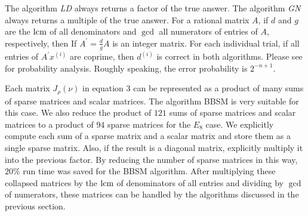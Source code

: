 The algorithm {\em LD}
always returns a factor of the true answer.
The algorithm {\em GN}
always returns a multiple of the true answer.
For a rational matrix $A$, if 
$d$ and $g$ are the $\mbox{lcm}$ of all denominators 
and $\gcd$ all numerators of entries of $A$, respectively,
then If $A^\prime = \frac{d}{g}A$ is an integer matrix.
For each individual trial,
if all entries of  $A^\prime x^{(i)}$ are coprime,
then $d^{(i)}$ is correct in both algorithms.
Please see \cite{Saunders::LA::2004} for probability analysis. 
Roughly speaking, the error probability is $2^{-n + 1}$.

Each matrix $J_\rho(\nu)$ in equation 3 can be represented as
a product of many sums of sparse matrices and scalar matrices.
The algorithm BBSM is very suitable for this case.
We also reduce the product of $121$ sums of sparse matrices and scalar matrices
to a product of $94$ sparse matrices for the $E_8$ case. 
We explicitly compute each sum of a sparse matrix and a scalar matrix and 
store them as a single sparse matrix.  Also, if the result is a diagonal matrix,
explicitly multiply it into the previous factor.
By reducing the number of sparse matrices in this way, 
$20\%$ run time was saved for the BBSM algorithm. 
After multiplying these collapsed matrices 
by the $\mbox{lcm}$ of denominators of all entries and dividing
by $\gcd$ of numerators, these matrices can be handled by the
algorithms discussed in the previous section.
